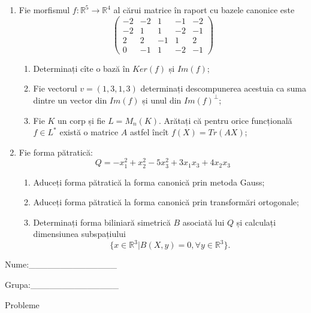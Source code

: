 \documentclass{article}
\begin{document}
\begin{enumerate}
 \item Fie morfismul $f:\mathbb{R}^5 \to \mathbb{R}^4$ al cărui matrice în raport cu bazele canonice este
$$\begin{pmatrix}
-2&-2&1&-1&-2\\
-2&1&1&-2&-1\\
2&2&-1&1&2\\
0&-1&1&-2&-1
\end{pmatrix}$$

\begin{enumerate}
\item Determinați cîte o bază în $Ker(f)$ și $Im(f)$;
\item Fie vectorul $v=(1,3,1,3)$ determinați descompunerea acestuia ca suma dintre un vector din $Im(f)$ și unul din $Im(f)^\perp$;
\item Fie $K$ un corp și fie $L=M_n(K)$. Arătați că pentru orice funcțională $f \in L^*$ există o matrice $A$ astfel încît $f(X)=Tr(AX)$;
\end{enumerate}
\item Fie forma pătratică:
$$Q= -x_1^2+x_2^2-5x_3^2+3x_1x_3+4x_2x_3$$

\begin{enumerate}
\item Aduceți forma pătratică la forma canonică prin metoda Gauss;
\item Aduceți forma pătratică la forma canonică prin transformări ortogonale;
\item Determinați forma biliniară simetrică $B$ asociată lui $Q$ și calculați dimensiunea subspațiului
$$\{x \in \mathbb{R}^3 | B(X,y)=0,\forall y \in \mathbb{R}^3\}.$$

\end{enumerate}
\end{enumerate}
\newpage
\begin{flushright}
Nume:\_\_\_\_\_\_\_\_\_\_\_\_\_\_
 
 
Grupa:\_\_\_\_\_\_\_\_\_\_\_\_\_\_
\end{flushright}
\begin{center}
\vspace{2cm}
{\Large Probleme}
\vspace{2cm}
\end{center}
\end{document}
